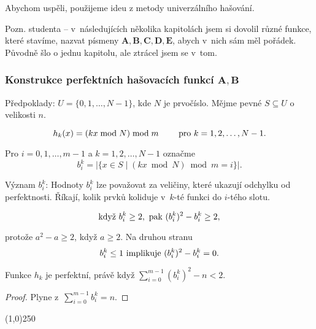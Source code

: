 \documentclass[a4paper,12pt]{article}
\newenvironment{myproof}{
  \begin{proof}
    
  }{
  \end{proof}
  \begin{center}
   \line(1,0){250}
   \end{center}
  }
\begin{document}
Abychom uspěli, použijeme ideu z metody univerzálního 
hašování.  

Pozn. studenta -- v~následujících několika kapitolách jsem si dovolil různé funkce, které stavíme, nazvat písmeny $\mathbf{A, B, C, D, E}$, abych v~nich sám měl pořádek. Původně šlo o jednu kapitolu, ale ztrácel jsem se v~tom.

\subsubsection{Konstrukce perfektních hašovacích funkcí $\mathbf{A,B}$}

Předpoklady:  $U=\{0,1,\dots,N-1\}$, kde $N$ je 
prvočíslo.  Mějme pevné $S\subseteq U$ o velikosti $n$.  

\begin{definice}
$$h_k(x)=(kx\bmod N)\bmod m\qquad\text{\rm\ pro }k=1,2,\dots,N-1.$$
\end{definice}

\begin{definice}
Pro $i=0,1,\dots,m-1$ a $k=1,2,\dots,N-1$ označme 
$$b_i^k=|\{x\in S\mid (kx\bmod N)\bmod m=i\}|.$$
\end{definice}

Význam $b_i^k$: Hodnoty $b_i^k$ lze považovat za 
veličiny, které ukazují odchylku od perfektnosti. Říkají, kolik prvků koliduje v~$k$-té funkci do $i$-tého slotu.

\begin{pozorovani}

$$\text{\rm když }b_i^k\ge 2,\text{\rm\ pak }(b_i^k)^2-b_i^k\ge 
2,$$

protože $a^2-a\ge 2$, když $a\ge 2$. Na druhou stranu 
$$b_i^k\le 1\text{\rm\ implikuje }(b_i^k)^2-b_i^k=0.$$
\end{pozorovani}

\begin{lemma}Funkce $h_k$ je perfektní, právě když 
$\sum_{i=0}^{m-1}(b_i^k)^2-n<2$.
\end{lemma}
\begin{myproof}
    Plyne z~$\sum_{i=0}^{m-1}b_i^k=n$.
\end{myproof}
\end{document}
